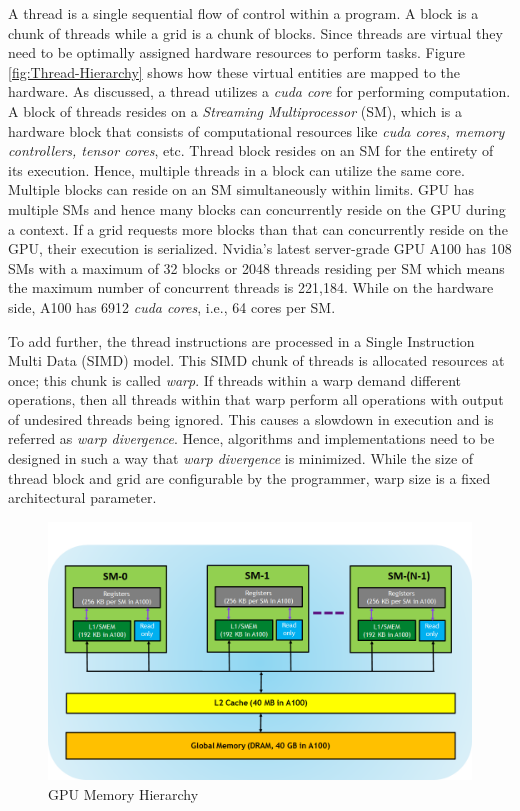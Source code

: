 A thread is a single sequential flow of control within a program.
A block is a chunk of threads while a grid is a chunk of blocks.
Since threads are virtual they need to be optimally assigned hardware resources to perform tasks.
Figure \ref{fig:Thread-Hierarchy} shows how these virtual entities are mapped to the hardware.
As discussed, a thread utilizes a \textit{cuda core} for performing computation.
A block of threads resides on a \textit{Streaming Multiprocessor} (SM), which is a hardware block that consists of computational resources like \textit{cuda cores, memory controllers, tensor cores}, etc.
Thread block resides on an SM for the entirety of its execution.
Hence, multiple threads in a block can utilize the same core.
Multiple blocks can reside on an SM simultaneously within limits.
GPU has multiple SMs and hence many blocks can concurrently reside on the GPU during a context.
If a grid requests more blocks than that can concurrently reside on the GPU, their execution is serialized.
Nvidia's latest server-grade GPU A100 has 108 SMs with a maximum of 32 blocks or 2048 threads residing per SM which means the maximum number of concurrent threads is  221,184.
While on the hardware side, A100 has 6912 \textit{cuda cores}, i.e., 64 cores per SM.

To add further, the thread instructions are processed in a Single Instruction Multi Data (SIMD) model. This SIMD chunk of threads is allocated resources at once; this chunk is called \textit{warp}. If threads within a warp demand different operations, then all threads within that warp perform all operations with output of undesired threads being ignored. This causes a slowdown in execution and is referred as \textit{warp divergence}. Hence, algorithms and implementations need to be designed in such a way that \textit{warp divergence} is minimized. While the size of thread block and grid are configurable by the programmer, warp size is a fixed architectural parameter.

\begin{figure}[h]
    \includegraphics[width=\textwidth]{fig/memory-hierarchy.png}
    \caption{GPU Memory Hierarchy}
    \label{fig:Memory-Hierarchy}
\end{figure}

